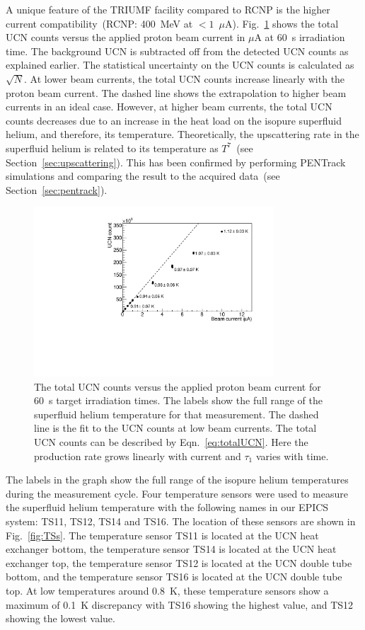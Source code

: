 A unique feature of the TRIUMF facility compared to RCNP is the higher
current compatibility~(RCNP: 400~MeV at $<1$~$\mu$A).
Fig.~\ref{fig:counts_vs_beam} shows the total UCN counts versus the
applied proton beam current in $\mu$A at 60~s irradiation time. The
background UCN is subtracted off from the detected UCN counts as
explained earlier. The statistical uncertainty on the UCN counts is
calculated as $\sqrt{N}$. At lower beam currents, the total UCN counts
increase linearly with the proton beam current. The dashed line shows
the extrapolation to higher beam currents in an ideal case. However,
at higher beam currents, the total UCN counts decreases due to an
increase in the heat load on the isopure superfluid helium, and
therefore, its temperature. Theoretically, the upscattering rate in
the superfluid helium is related to its temperature as $T^7$~(see
Section~\ref{sec:upscattering}). This has been confirmed by performing
PENTrack simulations and comparing the result to the acquired
data~(see Section~\ref{sec:pentrack}).



\begin{figure}[h!]
  \centering
  \includegraphics[width=0.8\textwidth]{UCNCounts_vs_Beam.pdf}
  \caption[UCN counts versus proton beam current]{The total UCN counts
    versus the applied proton beam current for 60~s target irradiation
    times. The labels show the full range of the superfluid helium
    temperature for that measurement. The dashed line is the fit to
    the UCN counts at low beam currents. The total UCN counts can be
    described by Eqn.~\ref{eq:totalUCN}. Here the production rate
    grows linearly with current and $\tau_1$ varies with time.}
  \label{fig:counts_vs_beam}
\end{figure}


The labels in the graph show the full range of the isopure helium
temperatures during the measurement cycle. Four temperature sensors
were used to measure the superfluid helium temperature with the
following names in our EPICS system: TS11, TS12, TS14 and TS16. The
location of these sensors are shown in Fig.~\ref{fig:TSs}. The
temperature sensor TS11 is located at the UCN heat exchanger bottom,
the temperature sensor TS14 is located at the UCN heat exchanger top,
the temperature sensor TS12 is located at the UCN double tube bottom,
and the temperature sensor TS16 is located at the UCN double tube
top. At low temperatures around 0.8~K, these temperature sensors show
a maximum of 0.1~K discrepancy with TS16 showing the highest value,
and TS12 showing the lowest value.


